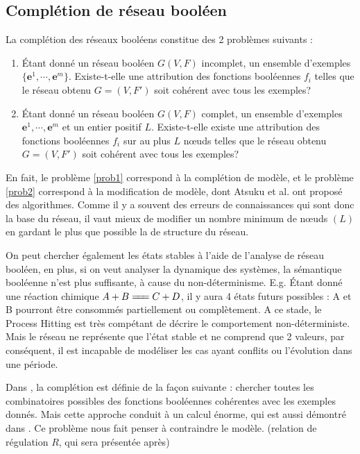 \documentclass[11pt]{report}
\theoremstyle{definition}
\begin{document}
\subsection*{Compl\'etion de r\'eseau bool\'een}
La compl\'etion des r\'eseaux bool\'eens constitue des 2 probl\`emes suivants \citep{Akutsu2009} : 
\begin{enumerate}
\item \label{prob1}\'Etant donn\'e un r\'eseau bool\'een $G(V,F)$ incomplet, un ensemble d'exemples $\{\mathbf{e}^1,\cdots,\mathbf{e}^m\}$. Existe-t-elle une attribution des fonctions bool\'eennes $f_i$ telles que le r\'eseau obtenu $G=(V,F')$ soit coh\'erent avec tous les exemples?
\item \label{prob2}\'Etant donn\'e un r\'eseau bool\'een $G(V,F)$ complet, un ensemble d'exemples ${\mathbf{e}^1,\cdots,\mathbf{e}^m}$ et un entier positif $L$. Existe-t-elle existe une attribution des fonctions bool\'eennes $f_i$ sur au plus $L$ n\oe uds telles que le r\'eseau obtenu $G=(V,F')$ soit coh\'erent avec tous les exemples?
\end{enumerate}
En fait, le probl\`eme \ref{prob1} correspond \`a la compl\'etion de mod\`ele, et le probl\`eme \ref{prob2} correspond \`a la modification de mod\`ele, dont Atsuku et al. ont propos\'e des algorithmes. Comme il y a souvent des erreurs de connaissances qui sont donc la base du r\'eseau, il vaut mieux de modifier un nombre minimum de n\oe uds $(L)$ en gardant le plus que possible la de structure du r\'eseau.

On peut chercher \'egalement les \'etats stables \`a l'aide de l'analyse de r\'eseau bool\'een, en plus, si on veut analyser la dynamique des syst\`emes, la s\'emantique bool\'eenne n'est plus suffisante, \`a cause du non-d\'eterminisme. E.g. \'Etant donn\'e une r\'eaction chimique $A+B\xlongequal{\quad} C+D$, il y aura 4 \'etats futurs possibles : A et B pourront \^etre consomm\'es partiellement ou compl\`etement. A ce stade, le Process Hitting est tr\`es comp\'etant de d\'ecrire le comportement non-d\'eterministe. Mais le r\'eseau ne repr\'esente que l'\'etat stable et ne comprend que 2 valeurs, par cons\'equent, il est incapable de mod\'eliser les cas ayant conflits ou l'\'evolution dans une p\'eriode.

Dans \citep{Akutsu2009}, la compl\'etion est d\'efinie de la fa\c con suivante : chercher toutes les combinatoires possibles des fonctions bool\'eennes coh\'erentes avec les exemples donn\'es. Mais cette approche conduit \`a un calcul \'enorme, qui est aussi d\'emontr\'e dans \citep{Akutsu2009}. Ce probl\`eme nous fait penser \`a contraindre le mod\`ele. (relation de r\'egulation $R$, qui sera pr\'esent\'ee apr\`es)
\end{document}
